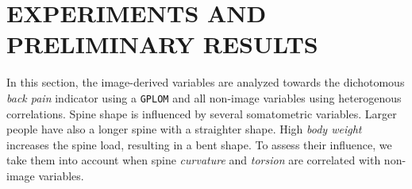 \documentclass[a4paper,twoside]{style/article}
\begin{document}
\section{\uppercase{Experiments and Preliminary Results}}
\label{sec:Experiments}
\noindent In this section, the image-derived variables are analyzed towards the dichotomous \emph{back pain} indicator using a \texttt{GPLOM} and all non-image variables using heterogenous correlations.
Spine shape is influenced by several somatometric variables.
Larger people have also a longer spine with a straighter shape.
High \emph{body weight} increases the spine load, resulting in a bent shape.
To assess their influence, we take them into account when spine \emph{curvature} and \emph{torsion} are correlated with non-image variables.
\end{document}
